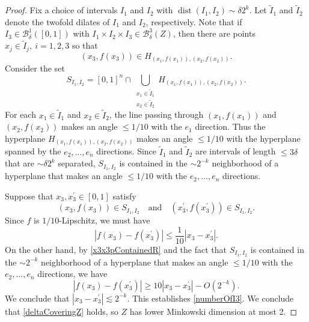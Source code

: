 \documentclass[dvipsnames,letterpaper,12pt]{article}
\numberwithin{equation}{section}
\theoremstyle{plain}
\theoremstyle{remark}
\begin{document}
\begin{proof}
Fix a choice of intervals $I_1$ and $I_2$ with $\operatorname{dist}(I_1,I_2)\sim \delta 2^k$. Let $\tilde I_1$ and $\tilde I_2$ denote the twofold dilates of $I_1$ and $I_2$, respectively. Note that if $I_3\in\mathcal{B}_\delta^1([0,1])$ with $I_1\times I_2\times I_3\in \mathcal{B}_{\delta}^{3}(Z)$, then there are points $x_j\in \tilde I_j,\ i=1,2,3$ so that 
%
\[ (x_3,f(x_3))\in H_{(x_1,f(x_1)), (x_2,f(x_2))}. \]
%
Consider the set
%
\[ S_{I_1,I_2}=[0,1]^n \cap \bigcup_{\substack{x_1\in \tilde I_1\\ x_2\in \tilde I_2}}H_{(x_1,f(x_1)), (x_2,f(x_2))}. \]
%
For each $x_1\in \tilde I_1$ and $x_2\in \tilde I_2$, the line passing through $(x_1,f(x_1))$ and $(x_2,f(x_2))$ makes an angle $\leq 1/10$ with the $e_1$ direction. Thus the hyperplane $H_{(x_1,f(x_1)), (x_2,f(x_2))}$ makes an angle $\leq 1/10$ with the hyperplane spanned by the $e_2,\ldots,e_n$ directions. Since $\tilde I_1$ and $\tilde I_2$ are intervals of length $\leq 3\delta$ that are $\sim \delta 2^k$ separated, $S_{I_1,I_2}$ is contained in the $\sim 2^{-k}$ neighborhood of a hyperplane that makes an angle $\leq 1/10$ with the $e_2,\ldots,e_n$ directions.  

Suppose that $x_3,x_3^\prime\in [0,1]$ satisfy
%
\begin{equation}\label{x3x3pContainedR}
(x_3,f(x_3))\in S_{I_1,I_2}\quad\textrm{and}\quad(x_3^\prime,f(x_3^\prime))\in S_{I_1,I_2}.
\end{equation}
%
Since $f$ is $1/10$-Lipschitz, we must have 
%
\[ |f(x_3)-f(x_3^\prime)|\leq \frac{1}{10}|x_3-x_3^\prime|. \]
%
On the other hand, by \eqref{x3x3pContainedR} and the fact that $S_{I_1,I_2}$ is contained in the $\sim 2^{-k}$ neighborhood of a hyperplane that makes an angle $\leq 1/10$ with the $e_2,\ldots,e_n$ directions, we have
%
\[ |f(x_3)-f(x_3^\prime)|\geq 10|x_3-x_3^\prime|-O(2^{-k}). \]
%
We conclude that $|x_3-x_3^\prime|\lesssim 2^{-k}$. This establishes \eqref{numberOfI3}. We conclude that \eqref{deltaCoveringZ} holds, so $Z$ has lower Minkowski dimension at most 2. 
\end{proof}



\end{document}
